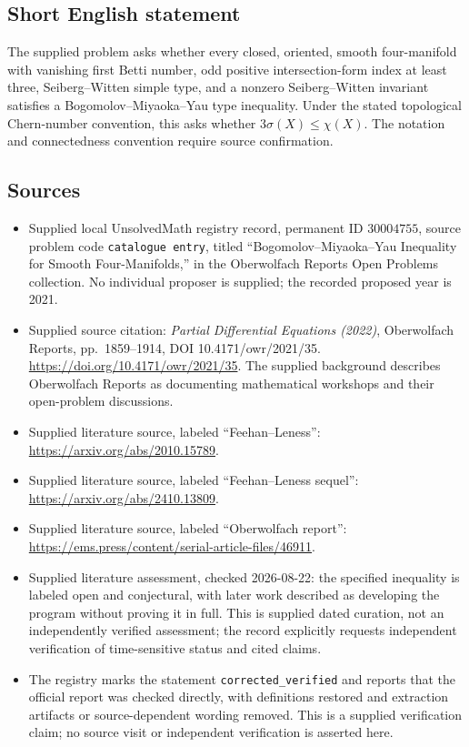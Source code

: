 \documentclass[11pt]{article}
\begin{document}
\subsection{Short English statement}
The supplied problem asks whether every closed, oriented, smooth four-manifold with vanishing first Betti number, odd positive intersection-form index at least three, Seiberg--Witten simple type, and a nonzero Seiberg--Witten invariant satisfies a Bogomolov--Miyaoka--Yau type inequality. Under the stated topological Chern-number convention, this asks whether \(3\sigma(X)\le\chi(X)\). The notation and connectedness convention require source confirmation.
\subsection{Sources}
\begin{itemize}
\item Supplied local UnsolvedMath registry record, permanent ID \(30004755\), source problem code \texttt{catalogue entry}, titled ``Bogomolov--Miyaoka--Yau Inequality for Smooth Four-Manifolds,'' in the Oberwolfach Reports Open Problems collection. No individual proposer is supplied; the recorded proposed year is 2021.
\item Supplied source citation: \emph{Partial Differential Equations (2022)}, Oberwolfach Reports, pp.\ 1859--1914, DOI 10.4171/owr/2021/35. \url{https://doi.org/10.4171/owr/2021/35}. The supplied background describes Oberwolfach Reports as documenting mathematical workshops and their open-problem discussions.
\item Supplied literature source, labeled ``Feehan--Leness'': \url{https://arxiv.org/abs/2010.15789}.
\item Supplied literature source, labeled ``Feehan--Leness sequel'': \url{https://arxiv.org/abs/2410.13809}.
\item Supplied literature source, labeled ``Oberwolfach report'': \url{https://ems.press/content/serial-article-files/46911}.
\item Supplied literature assessment, checked 2026-08-22: the specified inequality is labeled open and conjectural, with later work described as developing the program without proving it in full. This is supplied dated curation, not an independently verified assessment; the record explicitly requests independent verification of time-sensitive status and cited claims.
\item The registry marks the statement \texttt{corrected\_verified} and reports that the official report was checked directly, with definitions restored and extraction artifacts or source-dependent wording removed. This is a supplied verification claim; no source visit or independent verification is asserted here.
\end{itemize}
\end{document}
